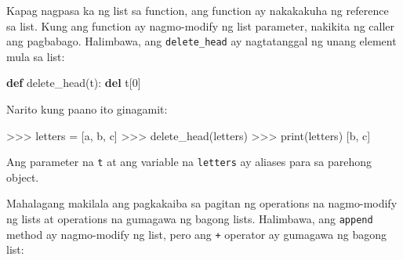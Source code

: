 \documentclass[10pt,]{book}
\newenvironment{Shaded}{}{}
\newcommand{\BuiltInTok}[1]{\textcolor[rgb]{0.00,0.50,0.00}{#1}}
\newcommand{\DecValTok}[1]{\textcolor[rgb]{0.25,0.63,0.44}{#1}}
\newcommand{\KeywordTok}[1]{\textcolor[rgb]{0.00,0.44,0.13}{\textbf{#1}}}
\newcommand{\NormalTok}[1]{#1}
\newcommand{\OperatorTok}[1]{\textcolor[rgb]{0.40,0.40,0.40}{#1}}
\newcommand{\StringTok}[1]{\textcolor[rgb]{0.25,0.44,0.63}{#1}}
\begin{document}
Kapag nagpasa ka ng list sa function, ang function ay nakakakuha ng
reference sa list. Kung ang function ay nagmo-modify ng list parameter,
nakikita ng caller ang pagbabago. Halimbawa, ang \texttt{delete\_head}
ay nagtatanggal ng unang element mula sa list:

\begin{Shaded}
\begin{Highlighting}[]
\KeywordTok{def}\NormalTok{ delete\_head(t):}
    \KeywordTok{del}\NormalTok{ t[}\DecValTok{0}\NormalTok{]}
\end{Highlighting}
\end{Shaded}

Narito kung paano ito ginagamit:

\begin{Shaded}
\begin{Highlighting}[]
\OperatorTok{\textgreater{}\textgreater{}\textgreater{}}\NormalTok{ letters }\OperatorTok{=}\NormalTok{ [}\StringTok{\textquotesingle{}a\textquotesingle{}}\NormalTok{, }\StringTok{\textquotesingle{}b\textquotesingle{}}\NormalTok{, }\StringTok{\textquotesingle{}c\textquotesingle{}}\NormalTok{]}
\OperatorTok{\textgreater{}\textgreater{}\textgreater{}}\NormalTok{ delete\_head(letters)}
\OperatorTok{\textgreater{}\textgreater{}\textgreater{}} \BuiltInTok{print}\NormalTok{(letters)}
\NormalTok{[}\StringTok{\textquotesingle{}b\textquotesingle{}}\NormalTok{, }\StringTok{\textquotesingle{}c\textquotesingle{}}\NormalTok{]}
\end{Highlighting}
\end{Shaded}

Ang parameter na \texttt{t} at ang variable na \texttt{letters} ay
aliases para sa parehong object.

Mahalagang makilala ang pagkakaiba sa pagitan ng operations na
nagmo-modify ng lists at operations na gumagawa ng bagong lists.
Halimbawa, ang \texttt{append} method ay nagmo-modify ng list, pero ang
\texttt{+} operator ay gumagawa ng bagong list:

  
\end{document}
